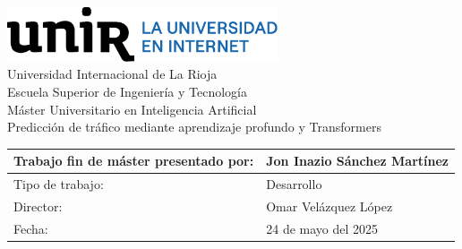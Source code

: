 \begin{titlepage}
	
	
	\centering
	\vspace{3cm}
	\includegraphics[width=0.60\textwidth]{includes/logoUnir.eps}\\	
	{\Huge Universidad Internacional de La Rioja \\}
	{\LARGE Escuela Superior de Ingeniería y Tecnología \\}
	\vspace{3cm}
	\setmainfont{Calibri Light}
	{\Large Máster Universitario en Inteligencia Artificial\\}
	\setmainfont{Calibri}
	{\Huge\textcolor{blueUnir}{Predicción de tráfico mediante aprendizaje profundo y Transformers} \\}
	\vfill{}
	\def\arraystretch{1}
	\setmainfont{Calibri Light}
	\begin{tabular}{| p{8cm} | p{7cm} |}
		\arrayrulecolor{gray80}
		\hline
		Trabajo fin de máster presentado por: & Jon Inazio Sánchez Martínez \\
		\hline
		Tipo de trabajo: & Desarrollo \\
		\hline
		Director: & Omar Velázquez López \\
		\hline
		Fecha: & 24 de mayo del 2025 \\
		\hline
	\end{tabular}
\vspace{4cm}
\end{titlepage}